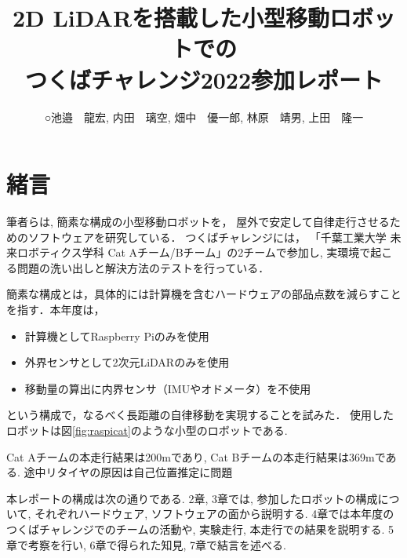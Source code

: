\documentclass[twocolumn,9pt]{jsproceedings}
\title{2D LiDARを搭載した小型移動ロボットでの\\つくばチャレンジ2022参加レポート}
\author{○池邉　龍宏\authorrefmark{1}, 内田　璃空\authorrefmark{1}, 畑中　優一郎\authorrefmark{1}, 林原　靖男\authorrefmark{1}, 上田　隆一\authorrefmark{1}}
\affiliation{千葉工業大学 未来ロボティクス学科 Cat Aチーム}
\begin{document}
\maketitle



\section{緒言}

筆者らは, 簡素な構成の小型移動ロボットを，
屋外で安定して自律走行させるためのソフトウェアを研究している．
つくばチャレンジには，
「千葉工業大学 未来ロボティクス学科 Cat Aチーム/Bチーム」の2チームで参加し, 
実環境で起こる問題の洗い出しと解決方法のテストを行っている．


簡素な構成とは，具体的には計算機を含むハードウェアの部品点数を減らすことを指す．本年度は，
\begin{itemize}
\item 計算機としてRaspberry Piのみを使用
\item 外界センサとして2次元LiDARのみを使用
\item 移動量の算出に内界センサ（IMUやオドメータ）を不使用
\end{itemize}
という構成で，なるべく長距離の自律移動を実現することを試みた．
使用したロボットは図\ref{fig:raspicat}のような小型のロボットである. 

Cat Aチームの本走行結果は200mであり, 
Cat Bチームの本走行結果は369mである. 
途中リタイヤの原因は自己位置推定に問題





本レポートの構成は次の通りである. 
2章, 3章では, 参加したロボットの構成について, 
それぞれハードウェア, ソフトウェアの面から説明する. 
4章では本年度のつくばチャレンジでのチームの活動や, 
実験走行, 本走行での結果を説明する.
5章で考察を行い, 6章で得られた知見, 7章で結言を述べる. 
\end{document}
